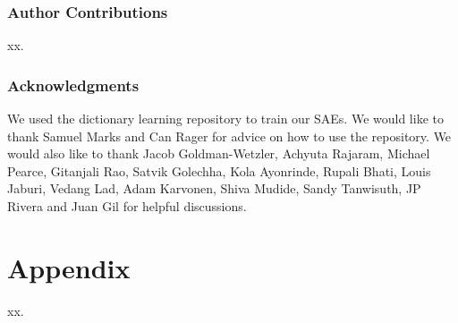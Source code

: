 \documentclass{article} %
\begin{document}
\subsubsection*{Author Contributions}
xx.

\subsubsection*{Acknowledgments}
We used the dictionary learning repository to train our SAEs. We would like to thank Samuel Marks and Can Rager for advice on how to use the repository. We would also like to thank Jacob Goldman-Wetzler, Achyuta Rajaram, Michael Pearce, Gitanjali Rao, Satvik Golechha, Kola Ayonrinde, Rupali Bhati, Louis Jaburi, Vedang Lad, Adam Karvonen, Shiva Mudide, Sandy Tanwisuth, JP Rivera and Juan Gil for helpful discussions.





\appendix
\section{Appendix}
xx.
\end{document}
